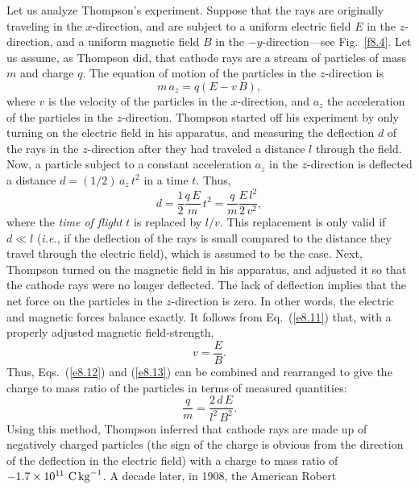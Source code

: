 Let us analyze  Thompson's experiment.  Suppose that
the rays are originally traveling in the $x$-direction, and are subject to
a uniform electric field $E$ in the   $z$-direction, and a uniform magnetic
field $B$ in the $-y$-direction---see Fig.~\ref{f8.4}. Let us assume, as Thompson did, that cathode
rays are a stream of particles of mass $m$ and charge $q$. The
equation of motion of the particles in the $z$-direction is
\begin{equation}\label{e8.11}
m \,a_z = q\left(E - v \,B\right),
\end{equation}
where $v$ is the velocity of the particles in the $x$-direction, and $a_z$
 the acceleration of the particles in the $z$-direction.
Thompson started off his experiment by
only turning on the  electric field in his apparatus, and
measuring the
deflection $d$ of the rays in the $z$-direction after they  had traveled a
distance  $l$ through the  field. Now, a particle subject to a
constant acceleration $a_z$ in the $z$-direction is deflected a
distance $d=(1/2)\,a_z\,t^2$ in a time $t$. 
Thus, 
\begin{equation}\label{e8.12}
d = \frac{1}{2}\frac{q\,E}{m}\,t^2 = \frac{q}{m} \frac{E\,l^2}{2\,v^2},
\end{equation}
where the {\em time of flight}\/ $t$ is replaced by $l/v$. This replacement is only
valid if $d\ll l$ ({\em i.e.}, if the deflection of
the rays is small compared to the distance they travel
through the electric field), which is assumed to be the case. 
Next, Thompson  turned on
the magnetic field in his apparatus, and adjusted it so that the cathode rays were
no longer deflected. The lack of deflection implies that the net force on the
particles in the $z$-direction is zero. In other words, the electric and
magnetic forces balance exactly. It follows from Eq.~(\ref{e8.11})
that, with a properly adjusted magnetic field-strength,
\begin{equation}\label{e8.13}
v = \frac{E}{B}.
\end{equation}
Thus, Eqs.~(\ref{e8.12}) and (\ref{e8.13})
 can be combined and rearranged to give the charge to mass ratio of
the particles in terms of measured quantities:
\begin{equation}
\frac{q}{m} = \frac{2\,d \,E}{l^2\, B^2}.
\end{equation}
Using this method, Thompson inferred that cathode rays are made up of
negatively charged particles (the sign of the charge is obvious from the
direction of the deflection in the electric field) with a charge to mass
ratio of $-1.7\times 10^{11}~{\rm C\,kg}^{-1}$. A decade later, in 1908, the American Robert
